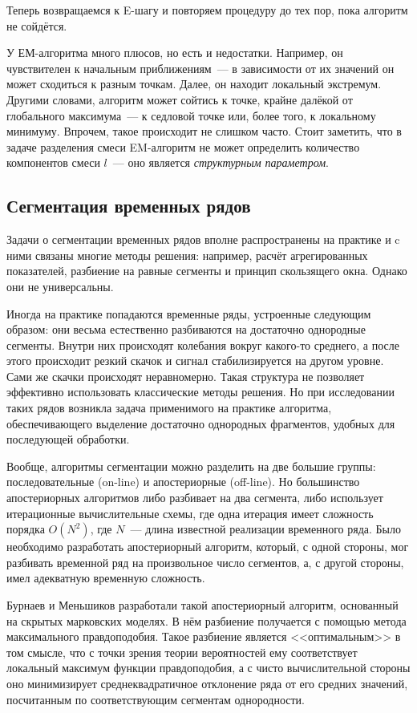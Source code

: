 Теперь возвращаемся к E-шагу и повторяем процедуру до тех пор, пока алгоритм не 
сойдётся.

У ЕМ-алгоритма много плюсов, но есть и недостатки. Например, он чувствителен к 
начальным приближениям~--- в зависимости от их значений он может сходиться к 
разным точкам. Далее, он находит локальный экстремум. Другими словами, алгоритм 
может сойтись к точке, крайне далёкой от глобального максимума~--- к седловой 
точке или, более того, к локальному минимуму. Впрочем, такое происходит не 
слишком часто. Стоит заметить, что в задаче разделения смеси EM-алгоритм не 
может определить количество компонентов смеси \(l\)~--- оно является 
\emph{структурным параметром}.

\subsection{Сегментация временных рядов}
Задачи о сегментации временных рядов вполне распространены на практике и c ними 
связаны многие методы решения: например, расчёт агрегированных показателей, 
разбиение на равные сегменты и принцип скользящего окна. Однако они не 
универсальны. 

Иногда на практике попадаются временные ряды, устроенные следующим образом: они 
весьма естественно разбиваются на достаточно однородные сегменты. Внутри них 
происходят колебания вокруг какого-то среднего, а после этого происходит резкий 
скачок и сигнал стабилизируется на другом уровне. Сами же скачки происходят 
неравномерно. Такая структура не позволяет эффективно использовать классические 
методы решения. Но при исследовании таких рядов возникла задача применимого на 
практике алгоритма, обеспечивающего выделение достаточно однородных фрагментов, 
удобных для последующей обработки.

Вообще, алгоритмы сегментации можно разделить на две большие группы: 
последовательные (on-line) и апостериорные (off-line). Но большинство 
апостериорных алгоритмов либо разбивает на два сегмента, либо использует 
итерационные вычислительные схемы, где одна итерация имеет сложность порядка
\(O(N^{2})\), где \(N\)~--- длина известной реализации временного ряда. Было 
необходимо разработать апостериорный алгоритм, который, с одной стороны, мог 
разбивать временной ряд на произвольное число сегментов, а, с другой стороны, 
имел адекватную временную сложность. 

Бурнаев и Меньшиков разработали такой апостериорный алгоритм, основанный на 
скрытых марковских моделях. В нём разбиение получается с помощью метода 
максимального правдоподобия. Такое разбиение является <<оптимальным>> в том 
смысле, что с точки зрения теории вероятностей ему соответствует локальный 
максимум функции правдоподобия, а с чисто вычислительной стороны оно 
минимизирует среднеквадратичное отклонение ряда от его средних значений, 
посчитанным по соответствующим сегментам однородности. 

